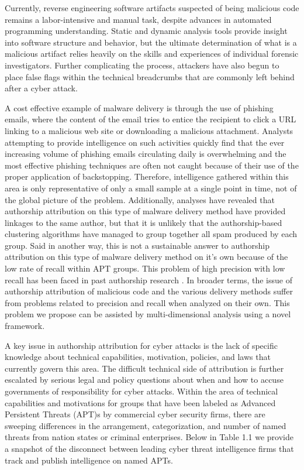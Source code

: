 \documentclass[12pt]{report}
\begin{document}
Currently, reverse engineering software artifacts suspected of being malicious code remains a labor-intensive and manual task, despite advances in automated programming understanding.  Static and dynamic analysis tools provide insight into software structure and behavior, but the ultimate determination of what is a malicious artifact relies heavily on the skills and experiences of individual forensic investigators.  Further complicating the process, attackers have also begun to place false flags within the technical breadcrumbs that are commonly left behind after a cyber attack.  

A cost effective example of malware delivery is through the use of phishing emails, where the content of the email tries to entice the recipient to click a URL linking to a malicious web site or downloading a malicious attachment. Analysts attempting to provide intelligence on such activities quickly find that the ever increasing volume of phishing emails circulating daily is overwhelming and the most effective phishing techniques are often not caught because of their use of the proper application of backstopping.  Therefore, intelligence gathered within this area is only representative of only a small sample at a single point in time, not of the global picture of the problem.  Additionally, analyses have revealed that authorship attribution on this type of malware delivery method have provided linkages to the same author, but that it is unlikely that the authorship-based clustering algorithms have managed to group together all spam produced by each group.  Said in another way, this is not a sustainable answer to authorship attribution on this type of malware delivery method on it's own because of the low rate of recall within APT groups.  This problem of high precision with low recall has been faced in past authorship research \cite{li2017association}.  In broader terms, the issue of authorship attribution of malicious code and the various delivery methods suffer from problems related to precision and recall when analyzed on their own.  This problem we propose can be assisted by multi-dimensional analysis using a novel framework.

A key issue in authorship attribution for cyber attacks is the lack of specific knowledge about technical capabilities, motivation, policies, and laws that currently govern this area.  The difficult technical side of attribution is further escalated by serious legal and policy questions about when and how to accuse governments of responsibility for cyber attacks.  Within the area of technical capabilities and motivations for groups that have been labeled as Advanced Persistent Threats (APT)s by commercial cyber security firms, there are sweeping differences in the arrangement, categorization, and number of named threats from nation states or criminal enterprises. \cite{romanosky2019private}  Below in Table 1.1 we provide a snapshot of the disconnect between leading cyber threat intelligence firms that track and publish intelligence on named APTs.
\end{document}
